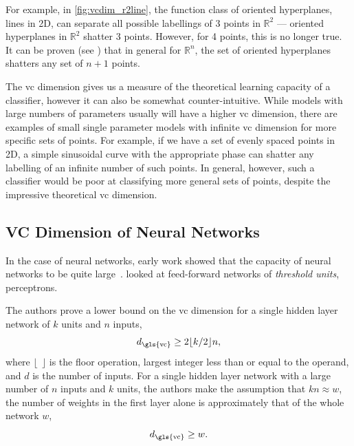 \documentclass[thesis]{subfiles}
\begin{document}
    For example, in \cref{fig:vcdim_r2line}, the function class of oriented hyperplanes, \ie lines in 2D, can separate all possible labellings of 3 points in $\mathbb{R}^2$ --- oriented hyperplanes in $\mathbb{R}^2$ shatter 3 points. However, for 4 points, this is no longer true. It can be proven (see \citet{burges1998tutorial}) that in general for $\mathbb{R}^n$, the set of oriented hyperplanes shatters any set of $n+1$ points.

    The \gls{vc} dimension gives us a measure of the theoretical learning capacity of a classifier, however it can also be somewhat counter-intuitive. While models with large numbers of parameters usually will have a higher \gls{vc} dimension, there are examples of small single parameter models with infinite \gls{vc} dimension for more specific sets of points. For example, if we have a set of evenly spaced points in 2D, a simple sinusoidal curve with the appropriate phase can shatter any labelling of an infinite number of such points. In general, however, such a classifier would be poor at classifying more general sets of points, despite the impressive theoretical \gls{vc} dimension.
    
    \subsection{VC Dimension of Neural Networks}
    In the case of neural networks, early work showed that the capacity of neural networks to be quite large~\citep{hornik89a,baum1989size}. \citet{baum1989size} looked at feed-forward networks of \emph{threshold units}, \ie perceptrons. %
    
    The authors prove a lower bound on the \gls{vc} dimension for a single hidden layer network of $k$ units and $n$ inputs,
    \begin{equation}
        d_{\textrm{\gls{vc}}} \geq 2 \lfloor k/2 \rfloor n,
    \end{equation}
    where $\lfloor \ \ \rfloor$ is the floor operation, \ie largest integer less than or equal to the operand, and $d$ is the number of inputs. For a single hidden layer network with a large number of $n$ inputs and $k$ units, the authors make the assumption that $kn\approx w$, \ie the number of weights in the first layer alone is approximately that of the whole network $w$,
    \begin{equation}
        d_{\textrm{\gls{vc}}} \geq w.
    \end{equation}
\end{document}
